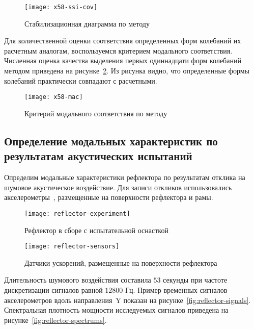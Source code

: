 \begin{figure}[!htb]
	\centerfloat
	\texttt{[image: x58-ssi-cov]}
	\caption{Стабилизационная диаграмма по методу } \label{fig:x58-ssi-cov}
\end{figure}

Для количественной оценки соответствия определенных форм колебаний их расчетным аналогам, воспользуемся критерием модального соответствия. Численная оценка качества выделения первых одиннадцати форм колебаний методом  приведена на рисунке~\ref{fig:x58-mac}. Из рисунка видно, что определенные формы колебаний практически совпадают с расчетными.

\begin{figure}[H]
	\centerfloat
	\texttt{[image: x58-mac]}
	\caption{Критерий модального соответствия по методу } \label{fig:x58-mac}
\end{figure}

\subsection{Определение модальных характеристик по результатам акустических испытаний}

Определим модальные характеристики рефлектора  по результатам отклика на шумовое акустическое воздействие. Для записи откликов использовались акселерометры~, размещенные на поверхности рефлектора и рамы.

\begin{figure}[!htb]
	\centerfloat
	\texttt{[image: reflector-experiment]}
	\caption{Рефлектор в сборе с испытательной оснасткой} \label{fig:reflector-experiment}
\end{figure}

\begin{figure}[H]
	\centerfloat
	\texttt{[image: reflector-sensors]}
	\caption{Датчики ускорений, размещенные на поверхности рефлектора} \label{fig:reflector-sensors}
\end{figure}

Длительность шумового воздействия составила $ 53 $ секунды при частоте дискретизации сигналов равной $ 12800 $ Гц. Пример временных сигналов акселерометров вдоль направления~$ \mathrm{Y} $ показан на рисунке~\ref{fig:reflector-signals}. Спектральная плотность мощности исследуемых сигналов приведена на рисунке~\ref{fig:reflector-spectrums}. 

